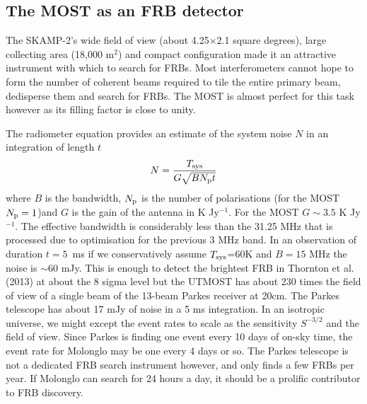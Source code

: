\subsection{The MOST as an FRB detector}
The SKAMP-2's wide field of view (about 4.25$\times$2.1 square degrees), large collecting area (18,000 m$^2$) and compact configuration made it an attractive instrument with which to search for FRBs. Most interferometers cannot hope to form the number of coherent beams required to tile the entire primary beam, dedisperse them and search for FRBs. The MOST is almost perfect for this task however as its filling factor is close to unity. 

The radiometer equation provides an estimate of the system noise $N$ in an integration of length $t$ 
\begin{equation}
N={{T_{\rm sys}}\over{G\sqrt{BN_{\rm p}t}}}
\end{equation}
\noindent where $B$ is the bandwidth, $N_{\rm p}$ is the number of polarisations (for the MOST $N_{\rm p}=1$)and $G$ is the gain of the antenna in K Jy$^{-1}$. For the MOST $G\sim 3.5$ K Jy$^{-1}$. The effective bandwidth is considerably less than the 31.25 MHz that is processed due to optimisation for the previous 3 MHz band. In an observation of duration $t=5$\, ms if we conservatively assume $T_{\rm sys}$=60K and $B=15 $ MHz the noise is $\sim$60 mJy. This is enough to detect the brightest FRB in Thornton et al. (2013) at about the 8 sigma level but the UTMOST has about 230 times the field of view of a single beam of the 13-beam Parkes receiver at 20cm. The Parkes telescope has about 17 mJy of noise in a 5 ms integration. In an isotropic universe, we might except the event rates to scale as the sensitivity $S^{-3/2}$ and the field of view. Since Parkes is finding one event every 10 days of on-sky time, the event rate for Molonglo may be one every 4 days or so. The Parkes telescope is not a dedicated FRB search instrument however, and only finds a few FRBs per year. If Molonglo can search for 24 hours a day, it should be a prolific contributor to FRB discovery.
